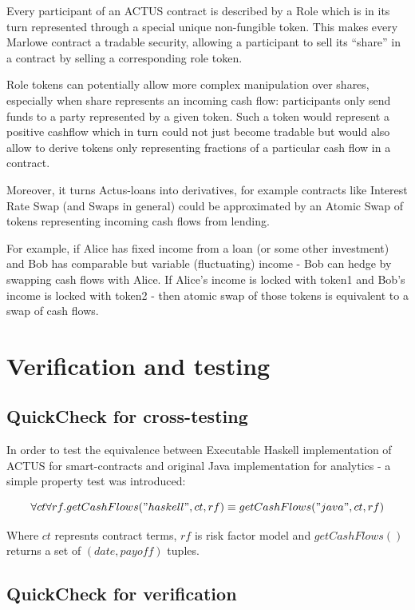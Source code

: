 \documentclass[runningheads]{llncs}
\begin{document}
Every participant of an ACTUS contract is described by a Role which
is in its turn represented through a special unique non-fungible token.
This makes every Marlowe contract a tradable security, allowing a
participant to sell its ``share'' in a contract by selling a corresponding
role token.

Role tokens can potentially allow more complex manipulation over shares,
especially when share represents an incoming cash flow: participants
only send funds to a party represented by a given token. Such a token
would represent a positive cashflow which in turn could not just become
tradable but would also allow to derive tokens only representing fractions
of a particular cash flow in a contract.

Moreover, it turns Actus-loans into derivatives, for example contracts
like Interest Rate Swap (and Swaps in general) could be approximated
by an Atomic Swap of tokens representing incoming cash flows from
lending.

For example, if Alice has fixed income from a loan (or some other
investment) and Bob has comparable but variable (fluctuating) income
- Bob can hedge by swapping cash flows with Alice. If Alice's income
is locked with token1 and Bob's income is locked with token2 - then
atomic swap of those tokens is equivalent to a swap of cash flows.

\section{Verification and testing}

\subsection{QuickCheck for cross-testing}

In order to test the equivalence between Executable Haskell implementation
of ACTUS for smart-contracts and original Java implementation for
analytics - a simple property test was introduced:

\noindent 
\begin{equation}
\forall ct\forall rf.getCashFlows("haskell",ct,rf)\equiv getCashFlows("java",ct,rf)
\end{equation}

Where $ct$ represnts contract terms, $rf$ is risk factor model and
$getCashFlows()$ returns a set of $(date,payoff)$ tuples.

\subsection{QuickCheck for verification}
\end{document}
